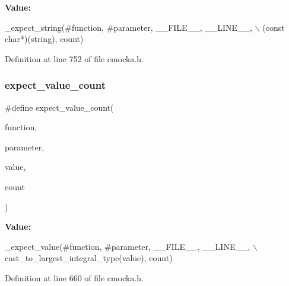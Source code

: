 {\bfseries Value\+:}
\begin{DoxyCode}
\_expect\_string(#\textcolor{keyword}{function}, #parameter, \_\_FILE\_\_, \_\_LINE\_\_, \(\backslash\)
                   (\textcolor{keyword}{const} \textcolor{keywordtype}{char}*)(\textcolor{keywordtype}{string}), count)
\end{DoxyCode}


Definition at line 752 of file cmocka.\+h.

\mbox{\label{group__cmocka__param_ga88b26660f9c9cdec0f28ee275fa8f749}} 
\subsubsection{\texorpdfstring{expect\+\_\+value\+\_\+count}{expect\_value\_count}}
{\footnotesize\ttfamily \#define expect\+\_\+value\+\_\+count(\begin{DoxyParamCaption}\item[{}]{function,  }\item[{}]{parameter,  }\item[{}]{value,  }\item[{}]{count }\end{DoxyParamCaption})}

{\bfseries Value\+:}
\begin{DoxyCode}
\_expect\_value(#\textcolor{keyword}{function}, #parameter, \_\_FILE\_\_, \_\_LINE\_\_, \(\backslash\)
                  cast\_to\_largest\_integral\_type(value), count)
\end{DoxyCode}


Definition at line 660 of file cmocka.\+h.

